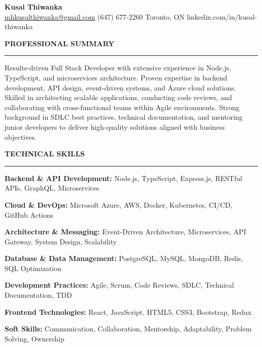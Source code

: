\documentclass[10pt,letterpaper]{article}
\begin{document}
\begin{center}
{\LARGE\textbf{Kusal Thiwanka}}\\[3pt]
\href{mailto:mhkusalthiwanka@gmail.com}{mhkusalthiwanka@gmail.com}\hspace{2em}%
(647) 677{-}2260\hspace{2em}%
Toronto, ON\hspace{2em}
linkedin.com/in/kusal-thiwanka
\end{center}

\vspace{6pt}

\textbf{PROFESSIONAL SUMMARY}\\[-8pt]
\noindent\rule{\textwidth}{1pt}

\vspace{-2pt}

Results-driven Full Stack Developer with extensive experience in Node.js, TypeScript, and microservices architecture. Proven expertise in backend development, API design, event-driven systems, and Azure cloud solutions. Skilled in architecting scalable applications, conducting code reviews, and collaborating with cross-functional teams within Agile environments. Strong background in SDLC best practices, technical documentation, and mentoring junior developers to deliver high-quality solutions aligned with business objectives.

\vspace{8pt}

\textbf{TECHNICAL SKILLS}\\[-8pt]
\noindent\rule{\textwidth}{1pt}

\vspace{-2pt}

\textbf{Backend \& API Development:} Node.js, TypeScript, Express.js, RESTful APIs, GraphQL, Microservices

\textbf{Cloud \& DevOps:} Microsoft Azure, AWS, Docker, Kubernetes, CI/CD, GitHub Actions

\textbf{Architecture \& Messaging:} Event-Driven Architecture, Microservices, API Gateway, System Design, Scalability

\textbf{Database \& Data Management:} PostgreSQL, MySQL, MongoDB, Redis, SQL Optimization

\textbf{Development Practices:} Agile, Scrum, Code Reviews, SDLC, Technical Documentation, TDD

\textbf{Frontend Technologies:} React, JavaScript, HTML5, CSS3, Bootstrap, Redux

\textbf{Soft Skills:} Communication, Collaboration, Mentorship, Adaptability, Problem Solving, Ownership
\end{document}
